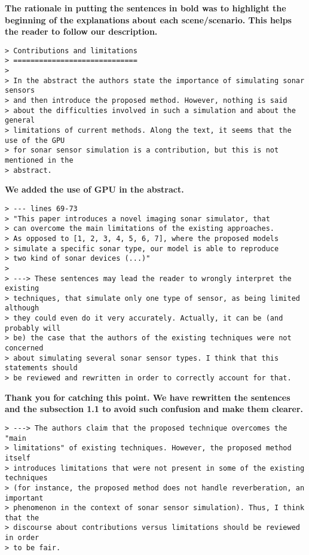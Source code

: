 \documentclass{article}
\begin{document}
\textbf{The rationale in putting the sentences in bold was to highlight the beginning
of the explanations about each scene/scenario. This helps the reader to follow our
description.}

\begin{verbatim}
> Contributions and limitations
> =============================
>
> In the abstract the authors state the importance of simulating sonar sensors
> and then introduce the proposed method. However, nothing is said
> about the difficulties involved in such a simulation and about the general
> limitations of current methods. Along the text, it seems that the use of the GPU
> for sonar sensor simulation is a contribution, but this is not mentioned in the
> abstract.
\end{verbatim}

\textbf{We added the use of GPU in the abstract.}


\begin{verbatim}
> --- lines 69-73
> "This paper introduces a novel imaging sonar simulator, that
> can overcome the main limitations of the existing approaches.
> As opposed to [1, 2, 3, 4, 5, 6, 7], where the proposed models
> simulate a specific sonar type, our model is able to reproduce
> two kind of sonar devices (...)"
>
> ---> These sentences may lead the reader to wrongly interpret the existing
> techniques, that simulate only one type of sensor, as being limited although
> they could even do it very accurately. Actually, it can be (and probably will
> be) the case that the authors of the existing techniques were not concerned
> about simulating several sonar sensor types. I think that this statements should
> be reviewed and rewritten in order to correctly account for that.
\end{verbatim}

\textbf{Thank you for catching this point. We have rewritten the sentences
and the subsection 1.1 to avoid such confusion and make them clearer.}

\begin{verbatim}
> ---> The authors claim that the proposed technique overcomes the "main
> limitations" of existing techniques. However, the proposed method itself
> introduces limitations that were not present in some of the existing techniques
> (for instance, the proposed method does not handle reverberation, an important
> phenomenon in the context of sonar sensor simulation). Thus, I think that the
> discourse about contributions versus limitations should be reviewed in order
> to be fair.
\end{verbatim}
\end{document}
